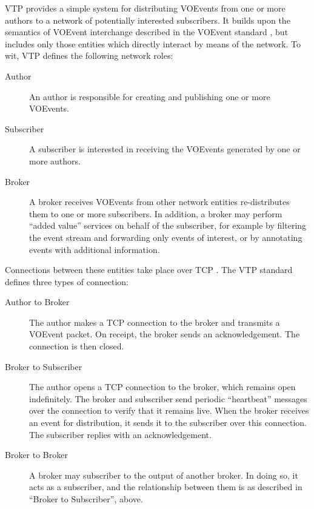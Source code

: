 \documentclass[5p,authoryear]{elsarticle}
\begin{document}
VTP provides a simple system for distributing VOEvents from one or more
authors to a network of potentially interested subscribers. It builds upon the
semantics of VOEvent interchange described in the VOEvent standard
\citep{Seaman:2011}, but includes only those entities which directly interact
by means of the network. To wit, VTP defines the following network roles:

\begin{description}

  \item[Author]{An author is responsible for creating and publishing one or
  more VOEvents.}

  \item[Subscriber]{A subscriber is interested in receiving the VOEvents
  generated by one or more authors.}

  \item[Broker]{A broker receives VOEvents from other network entities
  re-distributes them to one or more subscribers. In addition, a broker may
  perform ``added value'' services on behalf of the subscriber, for example by
  filtering the event stream and forwarding only events of interest, or by
  annotating events with additional information.}

\end{description}

Connections between these entities take place over TCP \citep{Cerf:1974}. The
VTP standard defines three types of connection:

\begin{description}

  \item[Author to Broker]{The author makes a TCP connection to the broker and
  transmits a VOEvent packet. On receipt, the broker sends an acknowledgement.
  The connection is then closed.}

  \item[Broker to Subscriber]{The author opens a TCP connection to the broker,
  which remains open indefinitely. The broker and subscriber send periodic
  ``heartbeat'' messages over the connection to verify that it remains live.
  When the broker receives an event for distribution, it sends it to the
  subscriber over this connection. The subscriber replies with an
  acknowledgement.}

  \item[Broker to Broker]{A broker may subscriber to the output of another
  broker. In doing so, it acts as a subscriber, and the relationship between
  them is as described in ``Broker to Subscriber'', above.}

\end{description}
\end{document}
